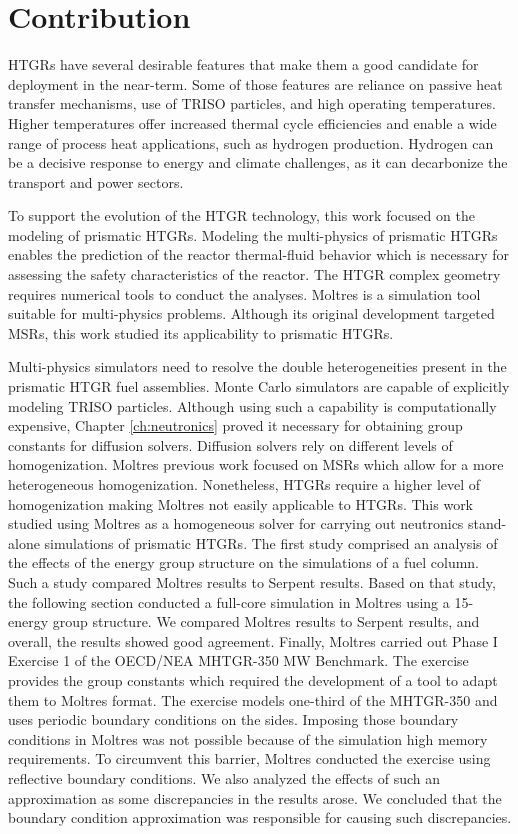 \section{Contribution}

HTGRs have several desirable features that make them a good candidate for deployment in the near-term.
Some of those features are reliance on passive heat transfer mechanisms, use of TRISO particles, and high operating temperatures.
Higher temperatures offer increased thermal cycle efficiencies and enable a wide range of process heat applications, such as hydrogen production.
Hydrogen can be a decisive response to energy and climate challenges, as it can decarbonize the transport and power sectors.

To support the evolution of the HTGR technology, this work focused on the modeling of prismatic HTGRs.
Modeling the multi-physics of prismatic HTGRs enables the prediction of the reactor thermal-fluid behavior which is necessary for assessing the safety characteristics of the reactor.
The HTGR complex geometry requires numerical tools to conduct the analyses.
Moltres is a simulation tool suitable for multi-physics problems.
Although its original development targeted MSRs, this work studied its applicability to prismatic HTGRs.

Multi-physics simulators need to resolve the double heterogeneities present in the prismatic HTGR fuel assemblies.
Monte Carlo simulators are capable of explicitly modeling TRISO particles.
Although using such a capability is computationally expensive, Chapter \ref{ch:neutronics} proved it necessary for obtaining group constants for diffusion solvers.
Diffusion solvers rely on different levels of homogenization.
Moltres previous work focused on MSRs which allow for a more heterogeneous homogenization.
Nonetheless, HTGRs require a higher level of homogenization making Moltres not easily applicable to HTGRs.
This work studied using Moltres as a homogeneous solver for carrying out neutronics stand-alone simulations of prismatic HTGRs.
The first study comprised an analysis of the effects of the energy group structure on the simulations of a fuel column.
Such a study compared Moltres results to Serpent results.
Based on that study, the following section conducted a full-core simulation in Moltres using a 15-energy group structure.
We compared Moltres results to Serpent results, and overall, the results showed good agreement.
Finally, Moltres carried out Phase I Exercise 1 of the OECD/NEA MHTGR-350 MW Benchmark.
The exercise provides the group constants which required the development of a tool to adapt them to Moltres format.
The exercise models one-third of the MHTGR-350 and uses periodic boundary conditions on the sides.
Imposing those boundary conditions in Moltres was not possible because of the simulation high memory requirements.
To circumvent this barrier, Moltres conducted the exercise using reflective boundary conditions.
We also analyzed the effects of such an approximation as some discrepancies in the results arose.
We concluded that the boundary condition approximation was responsible for causing such discrepancies.

